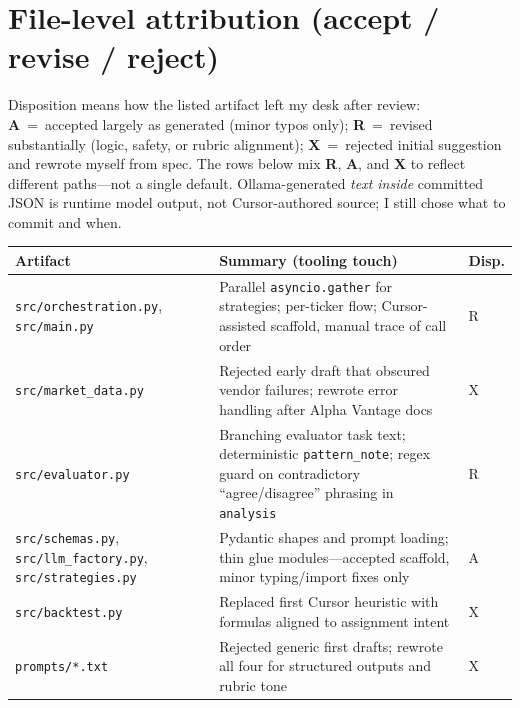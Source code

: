 \documentclass[11pt]{article}
\begin{document}
\section{File-level attribution (accept / revise / reject)}
\noindent
Disposition means how the listed artifact left my desk after review: \textbf{A}~=~accepted largely as generated (minor typos only); \textbf{R}~=~revised substantially (logic, safety, or rubric alignment); \textbf{X}~=~rejected initial suggestion and rewrote myself from spec. The rows below mix \textbf{R}, \textbf{A}, and \textbf{X} to reflect different paths---not a single default. Ollama-generated \emph{text inside} committed JSON is runtime model output, not Cursor-authored source; I still chose what to commit and when.

\begin{table}[h]
  \centering
  \footnotesize
  \setlength{\tabcolsep}{4.5pt}
  \renewcommand{\arraystretch}{1.22}
  \begin{tabular}{@{}>{\raggedright\arraybackslash}p{4.35cm}>{\raggedright\arraybackslash}p{6.55cm}>{\centering\arraybackslash}p{1.45cm}@{}}
    \toprule
    Artifact & Summary (tooling touch) & Disp. \\
    \midrule
    \texttt{src/orchestration.py}, \texttt{src/main.py} & Parallel \texttt{asyncio.gather} for strategies; per-ticker flow; Cursor-assisted scaffold, manual trace of call order & R \\
    \midrule
    \texttt{src/market\_data.py} & Rejected early draft that obscured vendor failures; rewrote error handling after Alpha Vantage docs & X \\
    \midrule
    \texttt{src/evaluator.py} & Branching evaluator task text; deterministic \texttt{pattern\_note}; regex guard on contradictory ``agree/disagree'' phrasing in \texttt{analysis} & R \\
    \midrule
    \texttt{src/schemas.py}, \texttt{src/llm\_factory.py}, \texttt{src/strategies.py} & Pydantic shapes and prompt loading; thin glue modules---accepted scaffold, minor typing/import fixes only & A \\
    \midrule
    \texttt{src/backtest.py} & Replaced first Cursor heuristic with formulas aligned to assignment intent & X \\
    \midrule
    \texttt{prompts/*.txt} & Rejected generic first drafts; rewrote all four for structured outputs and rubric tone & X \\

\end{tabular}
\end{table}
\end{document}
